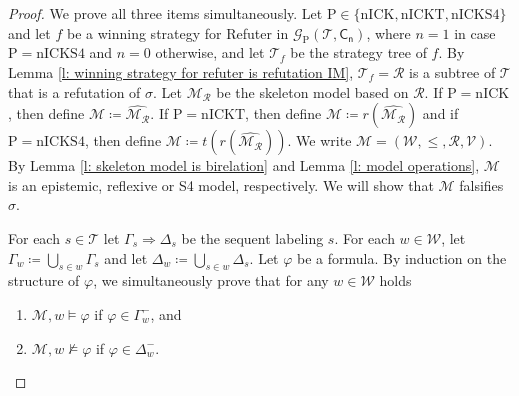 \documentclass{myifcolog}
\newcommand{\fw}{\mathcal{M}}
\newcommand{\W}{\mathcal{W}}
\newcommand{\rel}{\mathcal{R}}
\newcommand{\V}{\mathcal{V}}
\newcommand{\hickp}{\mathrm{P}}
\newcommand{\nick}{\mathrm{nICK}}
\newcommand{\nickt}{\mathrm{nICKT}}
\newcommand{\nicks}{\mathrm{nICKS4}}
\numberwithin{theorem}{section}
\begin{document}
\begin{proof}
We prove all three items simultaneously. Let $\hickp \in \{\nick, \nickt, \nicks\}$ and let $f$ be a winning strategy for Refuter in $\mathcal{G}_\hickp(\mathcal{T}, \mathsf{C_n})$, where $n=1$ in case $\hickp = \nicks$ and $n=0$ otherwise, and let $\mathcal{T}_f$ be the strategy tree of $f$. By Lemma \ref{l: winning strategy for refuter is refutation IM},  $\mathcal{T}_f = \mathscr{R}$ is a subtree of $\mathcal{T}$ that is a refutation of $\sigma$. Let $\fw_\mathscr{R}$ be the skeleton model based on $\mathscr{R}$. If $\hickp = \nick$, then define $\fw \coloneqq \hat{\fw_\mathscr{R}}$. If $\hickp = \nickt$, then define $\fw \coloneqq r(\hat{\fw_\mathscr{R}})$ and if $\hickp = \nicks$, then define $\fw \coloneqq t(r(\hat{\fw_\mathscr{R}}))$. We write $\fw =(\W, \leq, \rel, \V)$. By Lemma \ref{l: skeleton model is birelation} and Lemma \ref{l: model operations}, $\fw$ is an epistemic, reflexive or S4 model, respectively. We will show that $\fw$ falsifies $\sigma$.

For each $s \in \mathcal{T}$ let $\Gamma_s \Rightarrow \Delta_s$ be the sequent labeling $s$. For each $w\in \W$, let $\Gamma_w \coloneqq \bigcup_{s \in w} \Gamma_s$ and let $\Delta_w \coloneqq \bigcup_{s \in w} \Delta_s$. Let $\varphi$ be a formula. By induction on the structure of $\varphi$, we simultaneously prove that for any $w\in \W$ holds
\begin{enumerate}
    \item[(a)] $\fw,w\models \varphi$ if $\varphi\in \Gamma^-_{w}$, and
    \item[(b)] $\fw,w\not\models \varphi$ if $\varphi\in \Delta^-_{w}$.
\end{enumerate}


\end{proof}
\end{document}
